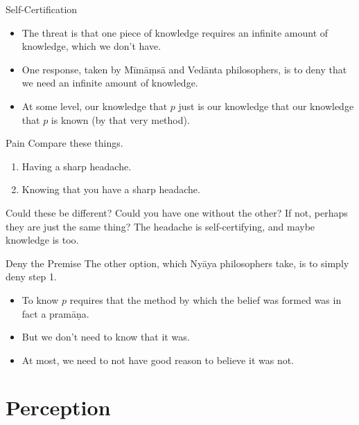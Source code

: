 \documentclass[
  17pt,
  letterpaper,
  ignorenonframetext,
  aspectratio=169,
  handout]{beamer}
\providecommand{\tightlist}{%
  \setlength{\itemsep}{0pt}\setlength{\parskip}{0pt}}\usepackage{longtable,booktabs,array}
\begin{document}
\begin{frame}{Self-Certification}
\protect\hypertarget{self-certification}{}
\begin{itemize}[<+->]
\tightlist
\item
  The threat is that one piece of knowledge requires an infinite amount
  of knowledge, which we don't have.
\item
  One response, taken by Mīmāṃsā and Vedānta philosophers, is to deny
  that we need an infinite amount of knowledge.
\item
  At some level, our knowledge that \(p\) just is our knowledge that our
  knowledge that \(p\) is known (by that very method).
\end{itemize}
\end{frame}

\begin{frame}{Pain}
\protect\hypertarget{pain}{}
Compare these things.

\begin{enumerate}[<+->]
\tightlist
\item
  Having a sharp headache.
\item
  Knowing that you have a sharp headache.
\end{enumerate}

\pause Could these be different? Could you have one without the other?
If not, perhaps they are just the same thing? The headache is
self-certifying, and maybe knowledge is too.
\end{frame}

\begin{frame}{Deny the Premise}
\protect\hypertarget{deny-the-premise}{}
The other option, which Nyāya philosophers take, is to simply deny step
1.

\begin{itemize}[<+->]
\tightlist
\item
  To know \(p\) requires that the method by which the belief was formed
  was in fact a pramāṇa.
\item
  But we don't need to know that it was.
\item
  At most, we need to not have good reason to believe it was not.
\end{itemize}
\end{frame}

\hypertarget{perception}{%
\section{Perception}\label{perception}}
\end{document}
